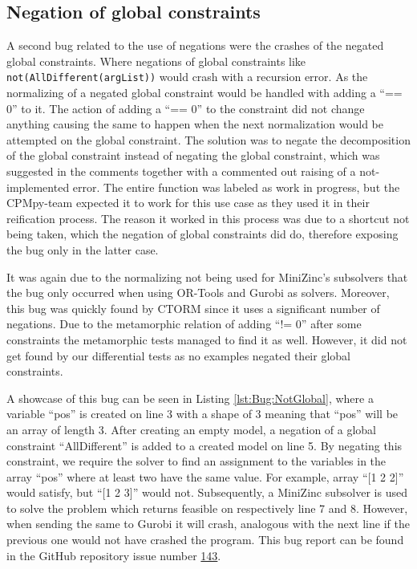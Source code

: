 \subsection{Negation of global constraints}
\label{res:bug:NegatedGlobal}
A second bug related to the use of negations were the crashes of the negated global constraints. Where negations of global constraints like \texttt{not(AllDifferent(argList))} would crash with a recursion error. As the normalizing of a negated global constraint would be handled with adding a “== 0” to it. The action of adding a “== 0” to the constraint did not change anything causing the same to happen when the next normalization would be attempted on the global constraint. The solution was to negate the decomposition of the global constraint instead of negating the global constraint, which was suggested in the comments together with a commented out raising of a not-implemented error. The entire function was labeled as work in progress, but the CPMpy-team expected it to work for this use case as they used it in their reification process. The reason it worked in this process was due to a shortcut not being taken, which the negation of global constraints did do, therefore exposing the bug only in the latter case.

It was again due to the normalizing not being used for MiniZinc’s subsolvers that the bug only occurred when using OR-Tools and Gurobi as solvers. Moreover, this bug was quickly found by CTORM since it uses a significant number of negations. Due to the metamorphic relation of adding “!= 0” after some constraints the metamorphic tests managed to find it as well. However, it did not get found by our differential tests as no examples negated their global constraints.


A showcase of this bug can be seen in Listing \ref{lst:Bug:NotGlobal}, where a variable “pos” is created on line 3 with a shape of 3 meaning that “pos” will be an array of length 3. After creating an empty model, a negation of a global constraint “AllDifferent” is added to a created model on line 5. By negating this constraint, we require the solver to find an assignment to the variables in the array “pos” where at least two have the same value. For example, array “[1 2 2]” would satisfy, but “[1 2 3]” would not. Subsequently, a MiniZinc subsolver is used to solve the problem which returns feasible on respectively line 7 and 8. However, when sending the same to Gurobi it will crash, analogous with the next line if the previous one would not have crashed the program. This bug report can be found in the GitHub repository issue number  \href{https://github.com/CPMpy/cpmpy/issues/143}{143}.


